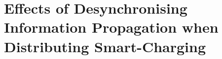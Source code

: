 \chapter{Effects of Desynchronising Information Propagation when Distributing Smart-Charging}
\label{ch3}










